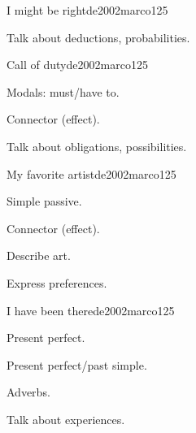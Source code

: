 \begin{syllabus}
\begin{unit}{I might be right}{}{de2002marco}{12}{5}
   \begin{learningoutcomes}
      \item Talk about deductions, probabilities. 
   \end{learningoutcomes}
\end{unit}

\begin{unit}{Call of duty}{}{de2002marco}{12}{5}
   \begin{topics}
      \item Modals: must/have to.
      \item Connector (effect).
   \end{topics}

   \begin{learningoutcomes}
      \item Talk about obligations, possibilities.
   \end{learningoutcomes}
\end{unit}

\begin{unit}{My favorite artist}{}{de2002marco}{12}{5}
   \begin{topics}
      \item Simple passive.
      \item Connector (effect).
   \end{topics}

   \begin{learningoutcomes}
      \item Describe art.
      \item Express preferences.
   \end{learningoutcomes}

\end{unit}

\begin{unit}{I have been there}{}{de2002marco}{12}{5}
   \begin{topics}
      \item Present perfect.
      \item Present perfect/past simple.
      \item Adverbs.
   \end{topics}

   \begin{learningoutcomes}
      \item Talk about experiences.
   \end{learningoutcomes}

\end{unit}


\end{syllabus}
